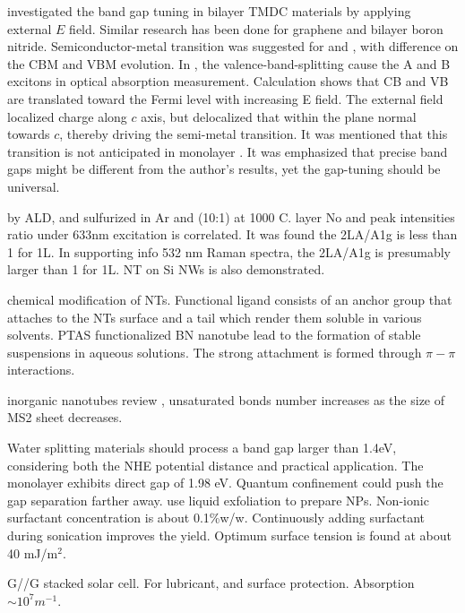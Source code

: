 \citeauthor{Ramasubramaniam2011} investigated the band gap tuning in bilayer TMDC materials by applying external $E$ field. Similar research has been done for graphene and bilayer boron nitride. Semiconductor-metal transition was suggested for  and , with difference on the CBM and VBM evolution. In , the valence-band-splitting cause the A and B excitons in optical absorption measurement. Calculation shows that CB and VB are translated toward the Fermi level with increasing E field.  The external field localized charge along $c$ axis, but delocalized that within the plane normal towards $c$, thereby driving the semi-metal transition. It was mentioned that this transition is not anticipated in monolayer . It was emphasized that precise band gaps might be different from the author’s results, yet the gap-tuning should be universal.\cite{Ramasubramaniam2011}

\cite{Song2013}  by ALD, and sulfurized in Ar and  (10:1) at 1000 C.  layer No and peak intensities ratio under 633nm excitation is correlated. It was found the 2LA/A1g is less than 1 for 1L. In supporting info 532 nm Raman spectra, the 2LA/A1g is presumably larger than 1 for 1L.  NT on Si NWs is also demonstrated.

\cite{Tenne2010} chemical modification of NTs. Functional ligand consists of an anchor group that attaches to the NTs surface and a tail which render them soluble in various solvents. PTAS functionalized BN nanotube lead to the formation of stable suspensions in aqueous solutions. The strong attachment is formed through $\pi-\pi$ interactions.


inorganic nanotubes review \cite{Tenne2004} , unsaturated bonds number increases as the size of MS2 sheet decreases.

Water splitting materials should process a band gap larger than 1.4eV, considering both the NHE potential distance and practical application. The monolayer  exhibits direct gap of 1.98 eV. Quantum confinement could push the gap separation farther away. \cite{wilcoxon1997} \citeauthor{Notley2013} use liquid exfoliation to prepare  NPs.\cite{Notley2013} Non-ionic surfactant concentration is about 0.1\%w/w. Continuously adding surfactant during sonication improves the yield. Optimum surface tension is found at about 40 mJ/m$^2$.

G//G stacked solar cell. For lubricant, and surface protection. Absorption $\sim 10^7 m^{-1}$. \cite{Britnell2013}

